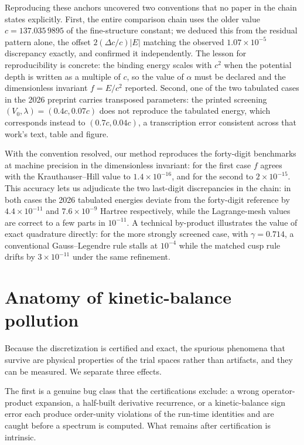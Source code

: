 \documentclass[aps,pra,twocolumn,superscriptaddress,showpacs,floatfix,longbibliography]{revtex4-2}
\begin{document}
Reproducing these anchors uncovered two conventions that no paper in the
chain states explicitly. First, the entire comparison chain uses the
older value $c=137.035\,9895$ of the fine-structure constant; we deduced
this from the residual pattern alone, the offset $2(\Delta c/c)|E|$
matching the observed $1.07\times10^{-5}$ discrepancy exactly, and
confirmed it independently. The lesson for reproducibility is concrete:
the binding energy scales with $c^{2}$ when the potential depth is written
as a multiple of $c$, so the value of $\alpha$ must be declared and the
dimensionless invariant $f=E/c^{2}$ reported. Second, one of the two
tabulated cases in the 2026 preprint carries transposed parameters: the
printed screening $(V_{0},\lambda)=(0.4c,0.07c)$ does not reproduce the
tabulated energy, which corresponds instead to $(0.7c,0.04c)$, a
transcription error consistent across that work's text, table and figure.

With the convention resolved, our method reproduces the forty-digit
benchmarks at machine precision in the dimensionless invariant: for the
first case $f$ agrees with the Krauthauser--Hill value to
$1.4\times10^{-16}$, and for the second to $2\times10^{-15}$. This
accuracy lets us adjudicate the two last-digit discrepancies in the
chain: in both cases the 2026 tabulated energies deviate from the
forty-digit reference by $4.4\times10^{-11}$ and $7.6\times10^{-9}$
Hartree respectively, while the Lagrange-mesh values are correct to a few
parts in $10^{-11}$. A technical by-product illustrates the value of exact
quadrature directly: for the more strongly screened case, with
$\gamma=0.714$, a conventional Gauss--Legendre rule stalls at $10^{-4}$
while the matched cusp rule drifts by $3\times10^{-11}$ under the same
refinement.

\section{Anatomy of kinetic-balance pollution}
\label{sec:anatomy}

Because the discretization is certified and exact, the spurious phenomena
that survive are physical properties of the trial spaces rather than
artifacts, and they can be measured. We separate three effects.

The first is a genuine bug class that the certifications exclude: a wrong
operator-product expansion, a half-built derivative recurrence, or a
kinetic-balance sign error each produce order-unity violations of the
run-time identities and are caught before a spectrum is computed. What
remains after certification is intrinsic.
\end{document}
